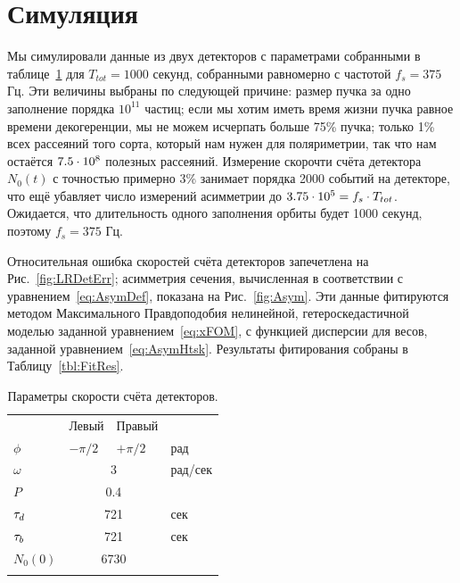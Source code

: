 \documentclass{jpconf}
\begin{document}
\section{Симуляция}
Мы симулировали данные из двух детекторов с параметрами собранными в таблице~\ref{tbl:DetCntRtParam} для $T_{tot}=1000$ секунд, собранными равномерно с частотой $f_s = 375$ Гц. Эти величины выбраны по следующей причине: размер пучка за одно заполнение порядка $10^{11}$ частиц; если мы хотим иметь время жизни пучка равное времени декогеренции, мы не можем исчерпать больше 75\% пучка; только 1\% всех рассеяний того сорта, который нам нужен для поляриметрии, так что нам остаётся ${7.5}\cdot 10^{8}$ полезных рассеяний. Измерение скорочти счёта детектора $N_0(t)$ с точностью примерно 3\% занимает порядка 2000 событий на детекторе, что ещё убавляет число измерений асимметрии до ${3.75}\cdot 10^{5}= f_s\cdot T_{tot}$. Ожидается, что длительность одного заполнения орбиты будет 1000 секунд, поэтому $f_s = 375$ Гц. 

Относительная ошибка скоростей счёта детекторов запечетлена на Рис.~\ref{fig:LRDetErr}; асимметрия сечения, вычисленная в соответствии с уравнением~\eqref{eq:AsymDef}, показана на Рис.~\ref{fig:Asym}.
Эти данные фитируются методом Максимального Правдоподобия нелинейной, гетероскедастичной моделью %
заданной уравнением~\eqref{eq:xFOM}, с функцией дисперсии для весов, заданной уравнением~\eqref{eq:AsymHtsk}. Результаты фитирования собраны в Таблицу~\ref{tbl:FitRes}.
\begin{table}[h]
	\caption{Параметры скорости счёта детекторов.\label{tbl:DetCntRtParam}}
	\centering
	\begin{tabular}{llll}
		\br
		&   Левый   &     Правый     &  \\ \mr
		$\phi$  & $-\pi/2$ &   $+\pi/2$    &   рад   \\
		$\omega$ &  \multicolumn{2}{c}{3}   & рад/сек \\
		$P$    & \multicolumn{2}{c}{0.4}  &  \\
		$\tau_d$  & \multicolumn{2}{c}{721}  &   сек   \\
		$\tau_b$  & \multicolumn{2}{c}{721}  &   сек   \\
		$N_0(0)$ & \multicolumn{2}{c}{6730} &  \\ \br
	\end{tabular}
\end{table}
\end{document}
